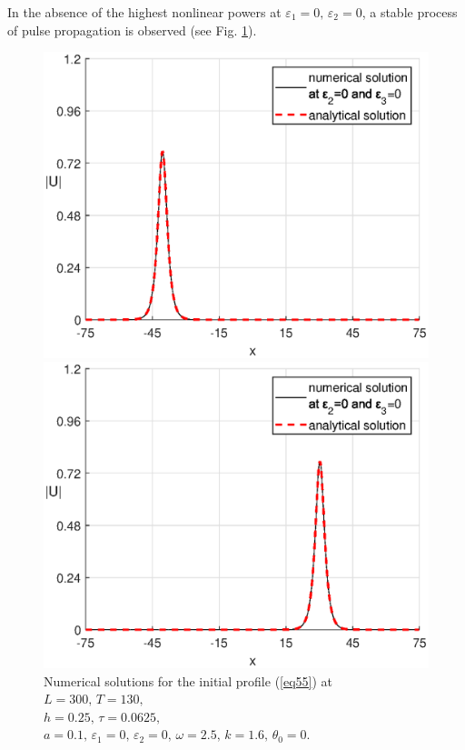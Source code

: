 \documentclass[preprint,12pt]{elsarticle}
\begin{document}
In the absence of the highest nonlinear powers at \(\varepsilon_{1}=0,\,\varepsilon_{2}=0\), a stable process of pulse propagation is observed (see Fig. \ref{fig21}).
\begin{figure}[H]
\begin{center}
\begin{minipage}[h]{0.48\linewidth}
\includegraphics[width=1\linewidth]{fig31.eps}
\end{minipage}
\hfill
\begin{minipage}[h]{0.48\linewidth}
\includegraphics[width=1\linewidth]{fig32.eps}
\end{minipage}
\end{center}
\caption{Numerical solutions for the initial profile (\ref{eq55}) at
\(L=300,\, T=130,\)\\ \(h=0.25,\, \tau=0.0625,\)
\(a=0.1,\,\varepsilon_{1}=0,\,\varepsilon_{2}=0,\, \omega=2.5,\, k=1.6,\, \theta_{0}=0\).}
\label{fig21}
\end{figure}
\end{document}
